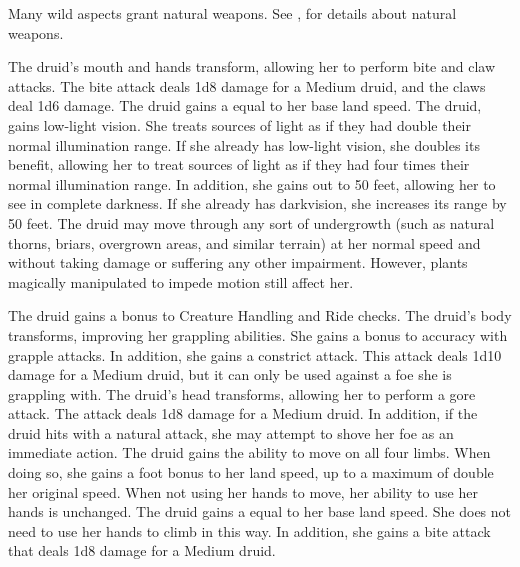         Many wild aspects grant natural weapons.
        See , for details about natural weapons.

        The druid's mouth and hands transform, allowing her to perform bite and claw attacks.
        The bite attack deals 1d8 damage for a Medium druid, and the claws deal 1d6 damage.
        The druid gains a  equal to her base land speed.
        The druid, gains low-light vision.
        She treats sources of light as if they had double their normal illumination range.
        If she already has low-light vision, she doubles its benefit, allowing her to treat sources of light as if they had four times their normal illumination range.
        In addition, she gains  out to 50 feet, allowing her to see in complete darkness.
        If she already has darkvision, she increases its range by 50 feet.
        The druid may move through any sort of undergrowth (such as natural thorns, briars, overgrown areas, and similar terrain) at her normal speed and without taking damage or suffering any other impairment.
        However, plants magically manipulated to impede motion still affect her.

        The druid gains a  bonus to Creature Handling and Ride checks.
        The druid's body transforms, improving her grappling abilities.
        She gains a  bonus to accuracy with grapple attacks.
        In addition, she gains a constrict attack.
        This attack deals 1d10 damage for a Medium druid, but it can only be used against a foe she is grappling with.
        The druid's head transforms, allowing her to perform a gore attack.
        The attack deals 1d8 damage for a Medium druid.
        In addition, if the druid hits with a natural attack, she may attempt to shove her foe as an immediate action.
        The druid gains the ability to move on all four limbs.
        When doing so, she gains a  foot bonus to her land speed, up to a maximum of double her original speed.
        When not using her hands to move, her ability to use her hands is unchanged.
        The druid gains a  equal to her base land speed.
        She does not need to use her hands to climb in this way.
        In addition, she gains a bite attack that deals 1d8 damage for a Medium druid.


